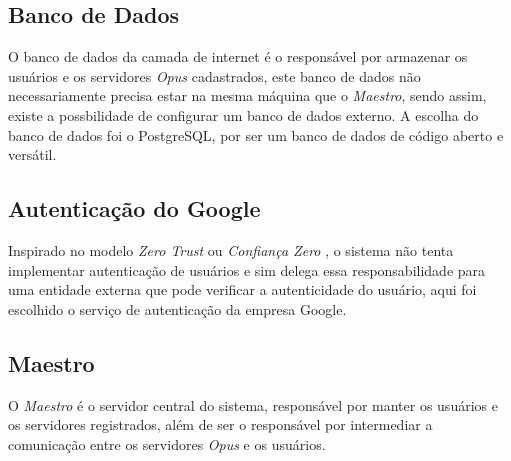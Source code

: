 \subsection{Banco de Dados}
\label{arq-subsubsec:internet-banco-dados}
O banco de dados da camada de internet é o responsável por armazenar os usuários e os servidores
\emph{Opus} cadastrados, este banco de dados não necessariamente precisa estar na mesma máquina
que o \emph{Maestro}, sendo assim, existe a possbilidade de configurar um banco de dados externo.
A escolha do banco de dados foi o PostgreSQL, por ser um banco de dados de código aberto e versátil.

\subsection{Autenticação do Google}
\label{arq-subsubsec:internet-autenticacao-google}
Inspirado no modelo \emph{Zero Trust} ou \emph{Confiança Zero} \cite{Kang2023}, o sistema não tenta implementar autenticação de usuários
e sim delega essa responsabilidade para uma entidade externa que pode verificar a autenticidade do usuário, 
aqui foi escolhido o serviço de autenticação da empresa Google.

\subsection{Maestro}
\label{arq-subsubsec:internet-maestro}
O \emph{Maestro} é o servidor central do sistema, responsável por manter os usuários e os servidores registrados,
além de ser o responsável por intermediar a comunicação entre os servidores \emph{Opus} e os usuários.
